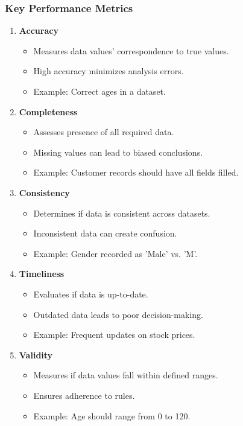 \documentclass[aspectratio=169]{beamer}
\begin{document}
\begin{frame}[fragile]
    \frametitle{Key Performance Metrics}

    \begin{enumerate}
        \item \textbf{Accuracy}
            \begin{itemize}
                \item Measures data values' correspondence to true values.
                \item High accuracy minimizes analysis errors.
                \item Example: Correct ages in a dataset.
            \end{itemize}
        
        \item \textbf{Completeness}
            \begin{itemize}
                \item Assesses presence of all required data.
                \item Missing values can lead to biased conclusions.
                \item Example: Customer records should have all fields filled.
            \end{itemize}

        \item \textbf{Consistency}
            \begin{itemize}
                \item Determines if data is consistent across datasets.
                \item Inconsistent data can create confusion.
                \item Example: Gender recorded as 'Male' vs. 'M'.
            \end{itemize}

        \item \textbf{Timeliness}
            \begin{itemize}
                \item Evaluates if data is up-to-date.
                \item Outdated data leads to poor decision-making.
                \item Example: Frequent updates on stock prices.
            \end{itemize}

        \item \textbf{Validity}
            \begin{itemize}
                \item Measures if data values fall within defined ranges.
                \item Ensures adherence to rules.
                \item Example: Age should range from 0 to 120.
            \end{itemize}
    \end{enumerate}
\end{frame}
\end{document}
